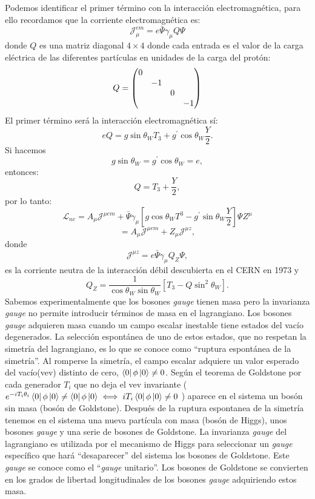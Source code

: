 \documentclass{article}
\theoremstyle{plain}
\theoremstyle{definition}
\begin{document}
	Podemos identificar el primer término con la interacción electromagnética, para ello recordamos que la corriente electromagnética es: \[
	\mathcal{J}^{em}_\mu = e\bar{\Psi}\gamma_{\mu}Q\Psi
	\] donde \(Q\) es una matriz diagonal \(4\times4\) donde cada entrada es el valor de la carga eléctrica de las diferentes partículas en unidades de la carga del protón:
	\[
	Q = 
	\left(\begin{array}{@{}cccc@{}}
	0 & & & \\
	& -1 & & \\
	& & 0 & \\
	& & & -1
	\end{array} \right)
	\]
	El primer término será la interacción electromagnética sí:
	\[
	eQ =g\sin\theta_WT_3 + g^\prime\cos\theta_W\frac{Y}{2}\text{.}
	\]
	Si hacemos \[
	g\sin\theta_W = g^\prime\cos\theta_W = e,
	\]
	entonces:
	\[
	Q = T_3 + \frac{Y}{2},
	\]
	por lo tanto:
	\[
	\mathcal{L}_{nc}=A_\mu\mathcal{J}^{\mu em} +\bar{\Psi}\gamma_{\mu}\left[g\cos\theta_WT^3 - g^\prime\sin\theta_W\frac{Y}{2}\right]\Psi Z^\mu
	\]
	\[
	= A_\mu\mathcal{J}^{\mu em} + Z_\mu\mathcal{J}^{\mu z},
	\]
	donde \[
	\mathcal{J}^{\mu z} = e\bar{\Psi}\gamma_{\mu}Q_Z\Psi,
	\]
	es la corriente neutra de la interacción débil descubierta en el CERN en 1973 y
		\[
	Q_Z = \frac{1}{\cos\theta_W\sin\theta_W}\left[T_3 -Q\sin^2\theta_W\right]\text{.}
	\]
	Sabemos experimentalmente que los bosones \textit{gauge}  tienen masa pero la invarianza \textit{gauge} no permite introducir términos de masa en el lagrangiano. Los bosones \textit{gauge} adquieren masa cuando un campo escalar inestable tiene estados del vacío degenerados. La selección espontánea de uno de estos estados, que no respetan la simetría del lagrangiano, es lo que se conoce como ``ruptura espontánea de la simetría''. Al romperse la simetría, el campo escalar adquiere un valor esperado del vacío(vev) distinto de cero, \(\bra{0}\phi\ket{0} \neq0 \). Según el teorema de Goldstone por cada generador \(T_i\) que no deja el vev invariante (\(e^{-iT_i\theta_i}\bra{0}\phi\ket{0}\neq\bra{0}\phi\ket{0} \iff iT_i\bra{0}\phi\ket{0}\neq0 \) ) aparece en el sistema un bosón sin masa (bosón de Goldstone). Después de la ruptura espontanea de la simetría tenemos en el sistema una nueva partícula con masa (bosón de Higgs), unos bosones \textit{gauge} y una serie de bosones de Goldstone. La invarianza \textit{gauge} del lagrangiano es utilizada por el mecanismo de Higgs para seleccionar un \textit{gauge} específico que hará ``desaparecer'' del sistema los bosones de Goldstone. Este \textit{gauge} se conoce como el ``\textit{gauge} unitario''. Los bosones de Goldstone se convierten en los grados de libertad longitudinales de los bosones \textit{gauge} adquiriendo estos masa.
\end{document}
